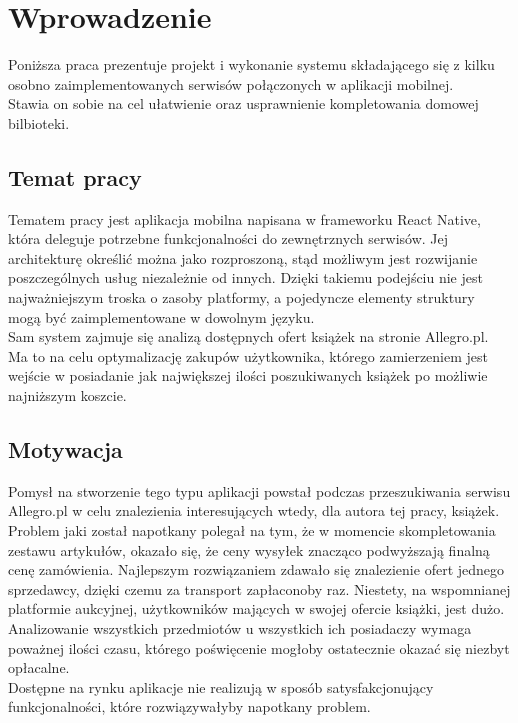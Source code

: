 \chapter{Wprowadzenie}
\label{cha:wprowadzenie}

Poniższa praca prezentuje projekt i wykonanie systemu składającego się z kilku osobno zaimplementowanych serwisów połączonych w aplikacji mobilnej.\\
Stawia on sobie na cel ułatwienie oraz usprawnienie kompletowania domowej bilbioteki.

\section{Temat pracy}
\label{sec:tematPracy}

Tematem pracy jest aplikacja mobilna napisana w frameworku React Native, która deleguje potrzebne funkcjonalności do zewnętrznych serwisów. Jej architekturę określić można jako rozproszoną, stąd możliwym jest rozwijanie poszczególnych usług niezależnie od innych. Dzięki takiemu podejściu nie jest najważniejszym troska o zasoby platformy, a pojedyncze elementy struktury mogą być zaimplementowane w dowolnym języku.\\
Sam system zajmuje się analizą dostępnych ofert książek na stronie Allegro.pl. Ma to na celu optymalizację zakupów użytkownika, którego zamierzeniem jest wejście w posiadanie jak największej ilości poszukiwanych książek po możliwie najniższym koszcie.



\section{Motywacja}
\label{sec:motywacja}
Pomysł na stworzenie tego typu aplikacji powstał podczas przeszukiwania serwisu Allegro.pl w celu znalezienia interesujących wtedy, dla autora tej pracy, książek. Problem jaki został napotkany polegał na tym, że w momencie skompletowania zestawu artykułów, okazało się, że ceny wysyłek znacząco podwyższają finalną cenę zamówienia. Najlepszym rozwiązaniem zdawało się znalezienie ofert jednego sprzedawcy, dzięki czemu za transport zapłaconoby raz. Niestety, na wspomnianej platformie aukcyjnej, użytkowników mających w swojej ofercie książki, jest dużo. Analizowanie wszystkich przedmiotów u wszystkich ich posiadaczy wymaga poważnej ilości czasu, którego poświęcenie mogłoby ostatecznie okazać się niezbyt opłacalne.\\
Dostępne na rynku aplikacje nie realizują w sposób satysfakcjonujący funkcjonalności, które rozwiązywałyby napotkany problem.

